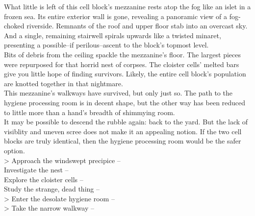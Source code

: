 What little is left of this cell block’s mezzanine rests atop the fog like an islet in a frozen sea. Its entire exterior wall is gone, revealing a panoramic view of a fog-choked riverside. Remnants of the roof and upper floor stab into an overcast sky. And a single, remaining stairwell spirals upwards like a twisted minaret, presenting a possible--if perilous--ascent to the block’s topmost level.\\

Bits of debris from the ceiling spackle the mezzanine's floor. The largest pieces were repurposed for that horrid nest of corpses. The cloister cells’ melted bars give you little hope of finding survivors. Likely, the entire cell block's population are knotted together in that nightmare.\\

This mezzanine's walkways have survived, but only just so. The path to the hygiene processing room is in decent shape, but the other way has been reduced to little more than a hand's breadth of shimmying room.\\

It may be possible to descend the rubble again: back to the yard. But the lack of visiblity and uneven scree does not make it an appealing notion. If the two cell blocks are truly identical, then the hygiene processing room would be the safer option.\\

> Approach the windswept precipice -- \\
 Investigate the nest -- \\
 Explore the cloister cells -- \\
 Study the strange, dead thing -- \\
> Enter the desolate hygiene room -- \\
> Take the narrow walkway -- 